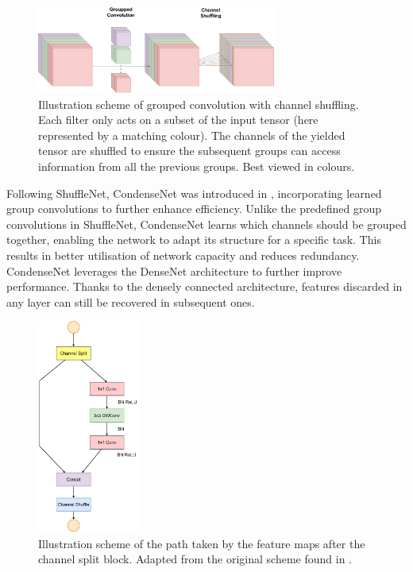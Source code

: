 \begin{figure}[htbp]
    \centering
    \includegraphics[width=0.70\textwidth]{chapter_sota/assets/group_conv_and_channel_shuffling.pdf}
    \caption{Illustration scheme of grouped convolution with channel shuffling.
    Each filter only acts on a subset of the input tensor (here represented by a
    matching colour). The channels of the yielded tensor are shuffled to ensure
    the subsequent groups can access information from all the previous groups. Best
    viewed in colours.}
    \label{fig:sota:shuffle_net}
\end{figure}

Following ShuffleNet, CondenseNet was introduced in \cite{huang2018condensenet},
incorporating learned group convolutions to further enhance efficiency. Unlike
the predefined group convolutions in ShuffleNet, CondenseNet learns which
channels should be grouped together, enabling the network to adapt its structure
for a specific task. This results in better utilisation of network capacity and
reduces redundancy. CondenseNet leverages the DenseNet architecture
\cite{huang2017densely} to further improve performance. Thanks to the densely
connected architecture, features discarded in any layer can still be recovered
in subsequent ones.\\

\begin{figure}[!h]
    \centering
    \includegraphics[width=0.3\textwidth]{chapter_sota/assets/channel_split.pdf}
    \caption{Illustration scheme of the path taken by the feature maps after the
    channel split block. Adapted from the original scheme found in \cite{MaShuffleNetV2}.}
    \label{fig:sota:channel_split}
\end{figure}

